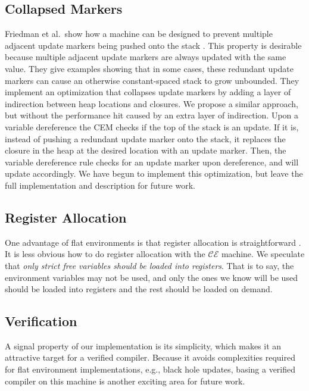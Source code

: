 \subsection{Collapsed Markers}
Friedman et al.\ show how a machine can be designed to prevent multiple adjacent
update markers being pushed onto the stack \cite{lkm}.  This property is
desirable because multiple adjacent update markers are always updated with the
same value. They give examples showing that in some cases, these redundant
update markers can cause an otherwise constant-spaced stack to grow unbounded.
They implement an optimization that collapses update markers by adding a layer
of indirection between heap locations and closures. We propose a similar
approach, but without the performance hit caused by an extra layer of
indirection. Upon a variable dereference the CEM checks if the top of the stack
is an update. If it is, instead of pushing a redundant update marker onto the
stack, it replaces the closure in the heap at the desired location with an update
marker.  Then, the variable dereference rule checks for an update marker upon
dereference, and will update accordingly. We have begun to implement this
optimization, but leave the full implementation and description for future work.

\subsection{Register Allocation} \label{sec:alloc}
One advantage of flat environments is that register allocation is
straightforward \cite{appel1992compiling,jonesstg,terei2010llvm}. It is less
obvious how to do register allocation with the $\mathcal{CE}$ machine.
We speculate that \emph{only strict free variables should be loaded into
registers}. That is to say, the environment variables may not be used, and only
the ones we know will be used should be loaded into registers and the rest
should be loaded on demand.

\subsection{Verification}
A signal property of our implementation is its simplicity, which makes it an
attractive target for a verified compiler. Because it avoids complexities
required for flat environment implementations, e.g., black hole updates, basing
a verified compiler on this machine is another exciting area for future work. 
